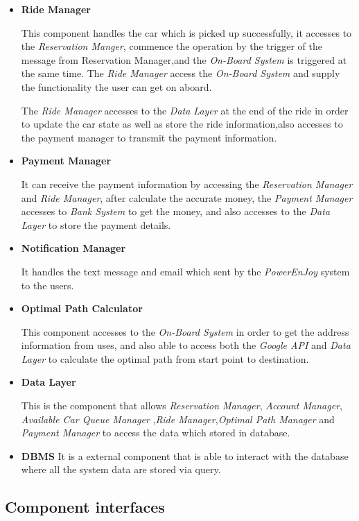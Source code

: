 \documentclass[a4paper,11pt]{article}
\begin{document}
\begin{itemize}
			\item \textbf{Ride Manager}
			
This component handles the car which is picked up successfully, it accesses to the \textsl{Reservation Manger}, commence the operation by the trigger of the message from Reservation Manager,and the \textsl{On-Board System} is triggered at the same time. The \textsl{Ride Manager} access the \textsl{On-Board System} and supply the functionality the user can get on aboard.

The \textsl{Ride Manager} accesses to the \textsl{Data Layer} at the end of the ride in order to update the car state as well as store the ride information,also accesses to the payment manager to transmit the payment information.

			\item \textbf{Payment Manager}	
			
It can receive the payment information by accessing the \textsl{Reservation Manager} and \textsl{Ride Manager}, after calculate the accurate money, the \textsl{Payment Manager} accesses to \textsl{Bank System} to get the money, and also accesses to the \textsl{Data Layer} to store the payment details.
		
			\item \textbf{Notification Manager}
			
It handles the text message and email which sent by the \textsl{PowerEnJoy} system to the users.

			\item \textbf{Optimal Path Calculator}
			
This component accesses to the \textsl{On-Board System} in order to get the address information from uses, and also able to access both the \textsl{Google API} and \textsl{Data Layer} to calculate the optimal path from start point to destination.

			\item \textbf{Data Layer}
			
			This is the component that allows \textsl{Reservation Manager}, \textsl{Account Manager}, \textsl{Available Car Queue Manager} ,\textsl{Ride Manager},\textsl{Optimal Path Manager} and \textsl{Payment Manager} to access the data which stored in database.

			\item \textbf{DBMS}
It is a external component that is able to interact with the database where all the system data are stored via query.
		\end{itemize}
	\subsection{Component interfaces}
	
\end{document}
